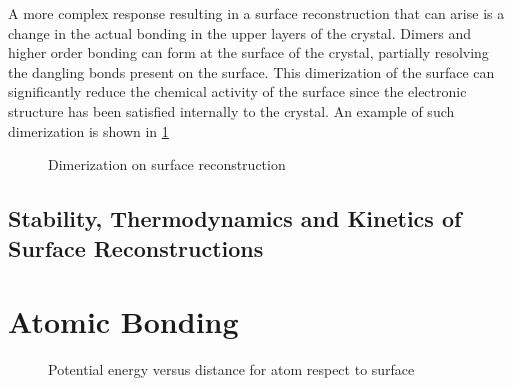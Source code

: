 A more complex response resulting in a surface reconstruction that can arise is a change in the actual bonding in the upper layers of the crystal. Dimers and higher order bonding can form at the surface of the crystal, partially resolving the dangling bonds present on the surface. This dimerization of the surface can significantly reduce the chemical activity of the surface since the electronic structure has been satisfied internally to the crystal. An example of such dimerization is shown in \cref{fig:back_recon_dimer}
\begin{figure}
    \centering
    \caption{\label{fig:back_recon_dimer}Dimerization on surface reconstruction}
\end{figure}

\subsection{Stability, Thermodynamics and Kinetics of Surface Reconstructions}

\section{Atomic Bonding}
\begin{figure}
    \centering
    \caption{\label{fig:back_bond_potential}Potential energy versus distance for atom respect to surface}
\end{figure}

